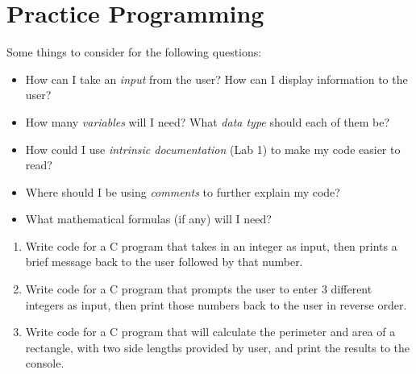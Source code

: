 \documentclass{pass}
\begin{document}
\section*{Practice Programming}
Some things to consider for the following questions:
	\begin{itemize}
	\item How can I take an \textit{input} from the user? How can I display information to the user?
	\item How many \textit{variables} will I need? What \textit{data type} should each of them be?
	\item How could I use \textit{intrinsic documentation} (Lab 1) to make my code easier to read?
	\item Where should I be using \textit{comments} to further explain my code?
	\item What mathematical formulas (if any) will I need?\\
	\end{itemize}
\begin{enumerate}[resume]
\item Write code for a C program that takes in an integer as input, then prints a brief message back to the user followed by that number.

\item Write code for a C program that prompts the user to enter 3 different integers as input, then print those numbers back to the user in reverse order.

\item Write code for a C program that will calculate the perimeter and area of a rectangle, with two side lengths provided by user, and print the results to the console.\\[8pt]

\end{enumerate}
\end{document}
